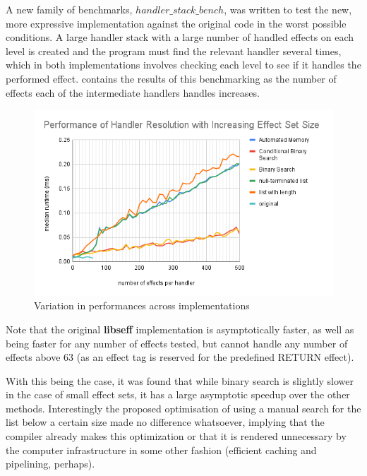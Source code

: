 \documentclass[logo,bsc,singlespacing,parskip,online]{infthesis}
\begin{document}
A new family of benchmarks, $handler\_stack\_bench$, was written to test the new, more expressive implementation against the original code in the worst possible conditions. A large handler stack with a large number of handled effects on each level is created and the program must find the relevant handler several times, which in both implementations involves checking each level to see if it handles the performed effect.  contains the results of this benchmarking as the number of effects each of the intermediate handlers handles increases.

\begin{figure}[ht]
    \centering
    \includegraphics[width=\linewidth]{lines_new.png}
    \caption{Variation in performances across implementations}
    \label{fig:parametrized_actual}
\end{figure}

Note that the original \textbf{libseff} implementation is asymptotically faster, as well as being faster for any number of effects tested, but cannot handle any number of effects above 63 (as an effect tag is reserved for the predefined RETURN effect).

With this being the case, it was found that while binary search is slightly slower in the case of small effect sets, it has a large asymptotic speedup over the other methods. Interestingly the proposed optimisation of using a manual search for the list below a certain size made no difference whatsoever, implying that the compiler already makes this optimization or that it is rendered unnecessary by the computer infrastructure in some other fashion (efficient caching and pipelining, perhaps).
\end{document}
